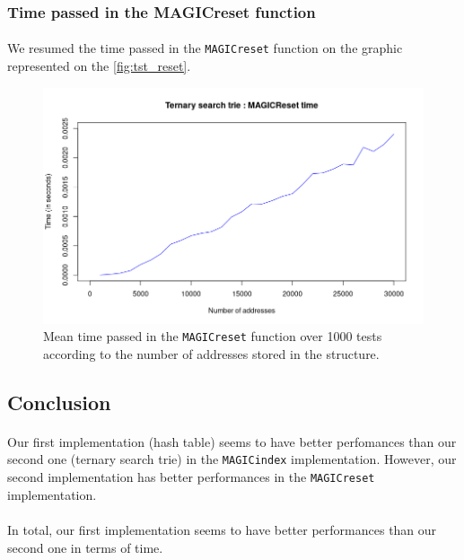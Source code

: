 \documentclass[a4paper, 11pt, oneside]{article}
\begin{document}
\subsubsection{Time passed in the MAGICreset function}
\paragraph{}We resumed the time passed in the \texttt{MAGICreset} function on the graphic represented on the \autoref{fig:tst_reset}. 
\begin{figure}[H]
  \centering
  \includegraphics[scale=0.6]{plots/tst_reset.png} 
  \caption{Mean time passed in the \texttt{MAGICreset} function over 1000 tests according to the number of addresses stored in the structure.}\label{fig:tst_reset}
\end{figure}

\subsection{Conclusion}
\paragraph{}Our first implementation (hash table) seems to have better perfomances than our second one (ternary search trie) in the \texttt{MAGICindex} implementation. However, our second implementation
has better performances in the \texttt{MAGICreset} implementation.

\paragraph{}In total, our first implementation seems to have better performances than our second one in terms of time.
\end{document}
